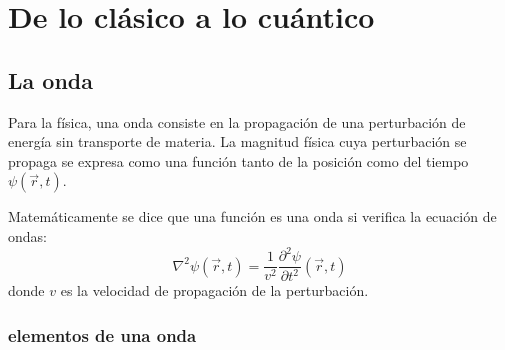 \chapter{De lo clásico a lo cuántico}\label{ch:de-lo-clásico-a-lo-cuántico}


\section{La onda}\label{sec:la-onda}

Para la física, una onda consiste en la propagación de una perturbación de energía sin transporte de materia.
La magnitud física cuya perturbación se propaga se expresa como una función tanto de la posición como del tiempo
$\psi(\vec{r},t)$.

Matemáticamente se dice que una función es una onda si verifica la ecuación de ondas:
\begin{equation}
    \label{eq:ecuacion-onda}
    \nabla^2\psi(\vec {r},t)=\frac {1}{v^2}\frac{\partial^2\psi}{\partial t^2}(\vec {r},t)
\end{equation}
donde $v$ es la velocidad de propagación de la perturbación.

\subsection{elementos de una onda}\label{subsec:elementos-de-una-onda}

